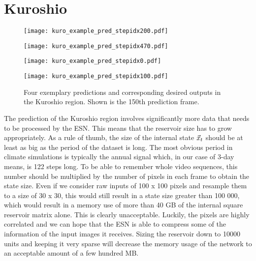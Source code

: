 \newpage
\section{Kuroshio}%
\label{sec:res_kuroshio}
\begin{figure}
  \begin{minipage}[b]{0.5\linewidth}
    \centering
    \texttt{[image: kuro\_example\_pred\_stepidx200.pdf]}
  \end{minipage}%
  \begin{minipage}[b]{0.5\linewidth}
    \centering
    \texttt{[image: kuro\_example\_pred\_stepidx470.pdf]}
  \end{minipage} 
  \begin{minipage}[b]{0.5\linewidth}
    \centering
    \texttt{[image: kuro\_example\_pred\_stepidx0.pdf]} 
  \end{minipage}%
  \begin{minipage}[b]{0.5\linewidth}
    \centering
    \texttt{[image: kuro\_example\_pred\_stepidx100.pdf]}
  \end{minipage} 
  \caption{Four exemplary predictions and corresponding desired outputs in the
    Kuroshio region. Shown is the 150th prediction frame.}
  \label{fig:kuro_pred_examples} 
\end{figure}


The prediction of the Kuroshio region involves significantly more data that
needs to be processed by the ESN. This means that the reservoir size has to
grow appropriately.  As a rule of thumb, the size of the internal state
$\vec{x}_t$ should be at least as big as the period of the dataset is long. The
most obvious period in climate simulations is typically the annual signal
which, in our case of 3-day means, is 122 steps long. To be able to remember
whole video sequences, this number should be multiplied by the number of pixels
in each frame to obtain the state size. Even if we consider raw inputs of 100 x 100
pixels and resample them to a size of 30 x 30, this would still result in a
state size greater than 100 000, which would result in a memory use of more
than 40 GB of the internal square reservoir matrix alone. This is clearly
unacceptable. Luckily, the pixels are highly correlated and we can hope that
the ESN is able to compress some of the information of the input images it
receives. Sizing the reservoir down to 10000 units and keeping it very sparse
will decrease the memory usage of the network to an acceptable amount of a few
hundred MB.

